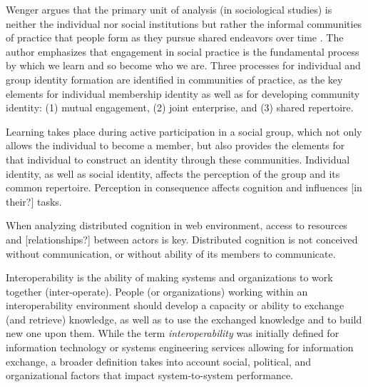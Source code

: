\documentclass[10pt,twocolumn,ieeetran]{article}
\newcommand{\nota}[1]{{\color{red}[#1]}}
\begin{document}


Wenger \cite{Wenger} argues that the primary unit of analysis (in sociological studies) is neither the individual nor social institutions but rather the informal communities of practice that people form as they pursue shared endeavors over time \cite{Wenger}. The author emphasizes that engagement in social practice is the fundamental process by which we learn and so become who we are. Three processes for individual and group identity formation are identified in communities of practice, as the key elements for individual membership identity as well as for developing community identity: (1) mutual engagement, (2) joint enterprise, and
(3) shared repertoire.


Learning takes place during active participation in a social group, which not only allows the individual to become a member, but also provides the elements for that individual to construct an identity through these communities. Individual identity, as well as social identity, affects the perception of the group and its common repertoire. Perception in consequence affects cognition and influences \nota{in their?} tasks.


When analyzing distributed
cognition in web environment, access to resources and \nota{relationships?} between actors is key. Distributed cognition
is not conceived without communication, or without ability of its members to communicate.

Interoperability is the ability of making systems and organizations to work together (inter-operate). People (or organizations) working within an interoperability environment should develop a capacity or ability to exchange (and retrieve) knowledge, as well as to use the exchanged knowledge and to build new one upon them. 
While the term {\it interoperability} was initially defined for information technology or systems engineering services  allowing for information exchange, a broader definition takes into account social, political, and organizational factors that impact system-to-system performance.
\end{document}
